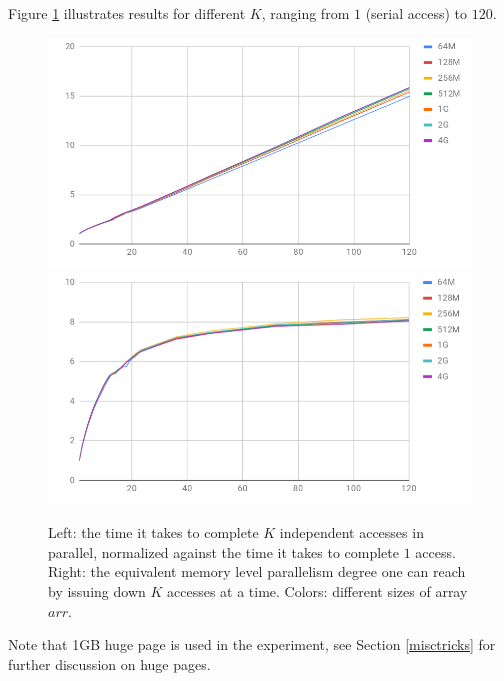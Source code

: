 \documentclass[11pt, usletter]{article}
\begin{document}
Figure \ref{mlprealworld} illustrates results for different $K$, ranging from $1$ (serial access) to $120$. 

\begin{figure}[!htb]
  \includegraphics[width=\linewidth]{equivalentCost.png}
\endminipage\hfill
{}
  \includegraphics[width=\linewidth]{equivalentMLP.png}
\endminipage\hfill
\caption{Left: the time it takes to complete $K$ independent accesses in parallel, 
normalized against the time it takes to complete $1$ access. 
Right: the equivalent memory level parallelism degree one can reach by issuing down $K$ accesses at a time. 
Colors: different sizes of array $arr$.}
\label{mlprealworld}
\end{figure}

Note that 1GB huge page is used in the experiment, see Section \ref{misctricks} for further discussion on huge pages.
\end{document}
